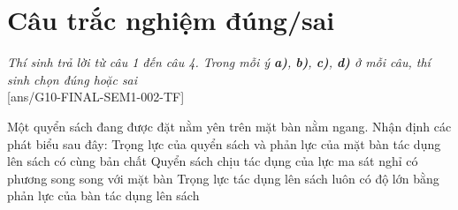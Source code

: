\section{Câu trắc nghiệm đúng/sai} 
\textit{Thí sinh trả lời từ câu 1 đến câu 4. Trong mỗi ý \textbf{a)}, \textbf{b)}, \textbf{c)}, \textbf{d)} ở mỗi câu, thí sinh chọn đúng hoặc sai}
\setcounter{ex}{0}\\
[ans/G10-FINAL-SEM1-002-TF]
\begin{ex}
	Một quyển sách đang được đặt nằm yên trên mặt bàn nằm ngang.	Nhận định các phát biểu sau đây:
	{Trọng lực của quyển sách và phản lực của mặt bàn tác dụng lên sách có cùng bản chất}
	{Quyển sách chịu tác dụng của lực ma sát nghỉ có phương song song với mặt bàn}
	{Trọng lực tác dụng lên sách luôn có độ lớn bằng phản lực của bàn tác dụng lên sách}
	\loigiai{}
\end{ex}

